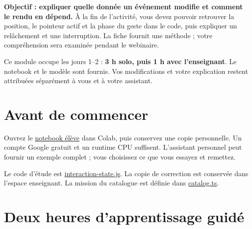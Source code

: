 \documentclass[
  canadien,
  11pt,
  a4paper,
]{report}
\begin{document}
\textbf{Objectif : expliquer quelle donnée un événement modifie et
comment le rendu en dépend.} À la fin de l'activité, vous devez pouvoir
retrouver la position, le pointeur actif et la phase du geste dans le
code, puis expliquer un relâchement et une interruption. La fiche
fournit une méthode ; votre compréhension sera examinée pendant le
webinaire.

Ce module occupe les jours 1--2 : \textbf{3 h solo, puis 1 h avec
l'enseignant}. Le notebook et le modèle sont fournis. Vos modifications
et votre explication restent attribuées séparément à vous et à votre
assistant.

\section{Avant de commencer}\label{avant-de-commencer}

Ouvrez le \href{../../notebooks/module-1.ipynb}{notebook élève} dans
Colab, puis conservez une copie personnelle. Un compte Google gratuit et
un runtime CPU suffisent. L'assistant personnel peut fournir un exemple
complet ; vous choisissez ce que vous essayez et remettez.

Le code d'étude est
\href{../../frontend/module-1/interaction-state.js}{interaction-state.js}.
La copie de correction est conservée dans l'espace enseignant. La
mission du catalogue est définie dans
\href{../../../../../packages/learning/src/catalog.ts}{catalog.ts}.

\section{Deux heures d'apprentissage
guidé}\label{deux-heures-dapprentissage-guiduxe9}
\end{document}
